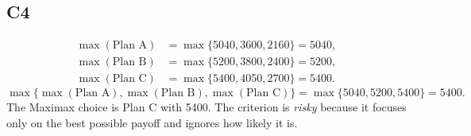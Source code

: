 \begin{ExamProblems}
\begin{center}
		\end{center}

		\subsection*{C4}
		\[
		\begin{aligned}
		\max(\text{Plan A}) &= \max\{5040,3600,2160\} = 5040,\\
		\max(\text{Plan B}) &= \max\{5200,3800,2400\} = 5200,\\
		\max(\text{Plan C}) &= \max\{5400,4050,2700\} = 5400.
		\end{aligned}
		\]
		\[
		\max\{\max(\text{Plan A}), \max(\text{Plan B}), \max(\text{Plan C})\}
		= \max\{5040, 5200, 5400\}
		= 5400.
		\]
		The Maximax choice is Plan C with 5400. The criterion is \emph{risky} because it focuses only on the best possible payoff and ignores how likely it is.


\end{ExamProblems}
